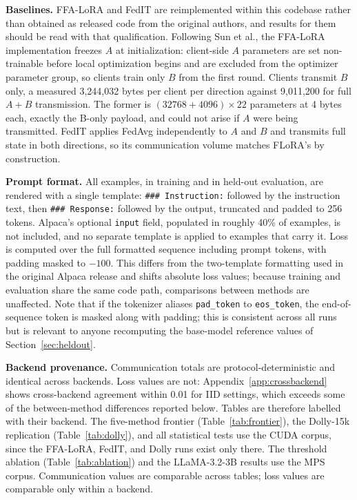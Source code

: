 \textbf{Baselines.} FFA-LoRA \citep{sun2024ffalora} and FedIT \citep{zhang2024federatedgpt} are reimplemented within this codebase rather than obtained as released code from the original authors, and results for them should be read with that qualification. Following Sun et al., the FFA-LoRA implementation freezes $A$ at initialization: client-side $A$ parameters are set non-trainable before local optimization begins and are excluded from the optimizer parameter group, so clients train only $B$ from the first round. Clients transmit $B$ only, a measured 3{,}244{,}032 bytes per client per direction against 9{,}011{,}200 for full $A{+}B$ transmission. The former is $(32768 + 4096) \times 22$ parameters at 4 bytes each, exactly the B-only payload, and could not arise if $A$ were being transmitted. FedIT applies FedAvg independently to $A$ and $B$ and transmits full state in both directions, so its communication volume matches FLoRA's by construction.

\textbf{Prompt format.} All examples, in training and in held-out evaluation, are rendered with a single template: \texttt{\#\#\# Instruction:} followed by the instruction text, then \texttt{\#\#\# Response:} followed by the output, truncated and padded to 256 tokens. Alpaca's optional \texttt{input} field, populated in roughly 40\% of examples, is not included, and no separate template is applied to examples that carry it. Loss is computed over the full formatted sequence including prompt tokens, with padding masked to $-100$. This differs from the two-template formatting used in the original Alpaca release and shifts absolute loss values; because training and evaluation share the same code path, comparisons between methods are unaffected. Note that if the tokenizer aliases \texttt{pad\_token} to \texttt{eos\_token}, the end-of-sequence token is masked along with padding; this is consistent across all runs but is relevant to anyone recomputing the base-model reference values of Section~\ref{sec:heldout}.

\textbf{Backend provenance.} Communication totals are protocol-deterministic and identical across backends. Loss values are not: Appendix~\ref{app:crossbackend} shows cross-backend agreement within 0.01 for IID settings, which exceeds some of the between-method differences reported below. Tables are therefore labelled with their backend. The five-method frontier (Table~\ref{tab:frontier}), the Dolly-15k replication (Table~\ref{tab:dolly}), and all statistical tests use the CUDA corpus, since the FFA-LoRA, FedIT, and Dolly runs exist only there. The threshold ablation (Table~\ref{tab:ablation}) and the LLaMA-3.2-3B results use the MPS corpus. Communication values are comparable across tables; loss values are comparable only within a backend.

